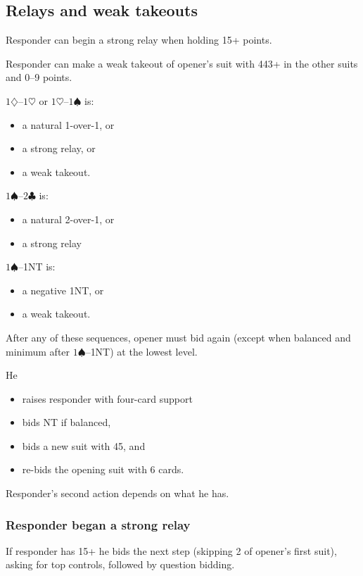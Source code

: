 \documentclass[a4paper, twoside, 11pt]{article}
\begin{document}
\begin{multicols}{3}
\subsection*{Relays and weak takeouts}

Responder can begin a strong relay when holding 15+ points.

Responder can make a weak takeout of opener's suit with 443+ in the other suits and 0--9 points.

 $1\diamondsuit$--$1\heartsuit$ or $1\heartsuit$--$1\spadesuit$ is:
\begin{itemize}
\item a natural 1-over-1, or
    \item a strong relay, or
        \item a weak takeout.
\end{itemize}

$1\spadesuit$--$2\clubsuit$ is:
\begin{itemize}
\item a natural 2-over-1, or
    \item a strong relay

\end{itemize}

$1\spadesuit$--\textnormal{1NT} is:
\begin{itemize}
\item a negative \textnormal{1NT}, or

        \item a weak takeout.
\end{itemize}

After any of these sequences, opener must bid again (except when balanced and minimum after $1\spadesuit$--\textnormal{1NT}) at the lowest level.

He
\begin{itemize}
    \item raises responder with
four-card support
\item bids NT if balanced,
\item bids a new
suit with 45, and
\item re-bids the opening suit
with 6 cards.
\end{itemize}

Responder's second action depends on what he has.

\subsubsection*{Responder began a strong relay}
If responder has 15+ he bids the next step (skipping 2 of opener's first suit), asking for top controls,
followed by question bidding.


\end{multicols}
\end{document}
